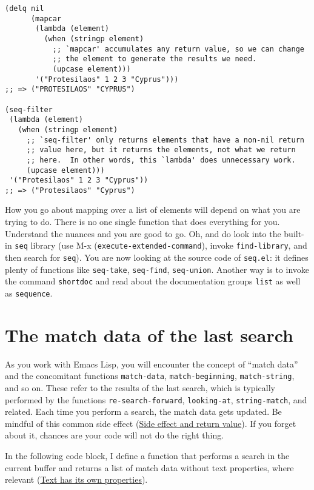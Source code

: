 \documentclass[11pt]{ctexart}
\begin{document}
\begin{verbatim}
(delq nil
      (mapcar
       (lambda (element)
         (when (stringp element)
           ;; `mapcar' accumulates any return value, so we can change
           ;; the element to generate the results we need.
           (upcase element)))
       '("Protesilaos" 1 2 3 "Cyprus")))
;; => ("PROTESILAOS" "CYPRUS")

(seq-filter
 (lambda (element)
   (when (stringp element)
     ;; `seq-filter' only returns elements that have a non-nil return
     ;; value here, but it returns the elements, not what we return
     ;; here.  In other words, this `lambda' does unnecessary work.
     (upcase element)))
 '("Protesilaos" 1 2 3 "Cyprus"))
;; => ("Protesilaos" "Cyprus")
\end{verbatim}

How you go about mapping over a list of elements will depend on what you are trying to do. There is no one single function that does everything for you. Understand the nuances and you are good to go. Oh, and do look into the built-in \texttt{seq} library (use M-x (\texttt{execute-extended-command}), invoke \texttt{find-library}, and then search for \texttt{seq}). You are now looking at the source code of \texttt{seq.el}: it defines plenty of functions like \texttt{seq-take}, \texttt{seq-find}, \texttt{seq-union}. Another way is to invoke the command \texttt{shortdoc} and read about the documentation groups \texttt{list} as well as \texttt{sequence}.
\section{The match data of the last search}
\label{sec:orge641c75}
As you work with Emacs Lisp, you will encounter the concept of ``match data'' and the concomitant functions \texttt{match-data}, \texttt{match-beginning}, \texttt{match-string}, and so on. These refer to the results of the last search, which is typically performed by the functions \texttt{re-search-forward}, \texttt{looking-at}, \texttt{string-match}, and related. Each time you perform a search, the match data gets updated. Be mindful of this common side effect (\hyperref[sec:org2689823]{Side effect and return value}). If you forget about it, chances are your code will not do the right thing.

In the following code block, I define a function that performs a search in the current buffer and returns a list of match data without text properties, where relevant (\hyperref[sec:orgcf4e6e5]{Text has its own properties}).
\end{document}
